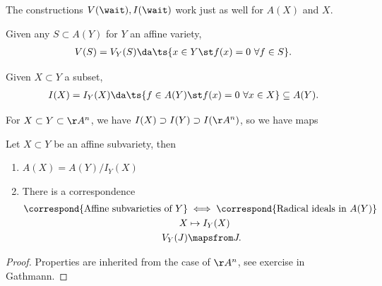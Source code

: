 \begin{observation}

The constructions \(V(\wait), I(\wait)\) work just as well for \(A(X)\)
and \(X\).

\end{observation}

Given any \(S\subset A(Y)\) for \(Y\) an affine variety,
\begin{align*}  
V(S) = V_Y(S) \da\ts{x\in Y \st f(x) = 0\,\,\forall f\in S}
.\end{align*}

Given \(X\subset Y\) a subset,
\begin{align*}  
I(X) = I_Y(X) \da\ts{f\in A(Y) \st f(x) = 0\,\,\forall x\in X} \subseteq A(Y)
.\end{align*}

\begin{example}

For \(X\subset Y \subset \AA^n\), we have
\(I(X) \supset I(Y) \supset I(\AA^n)\), so we have maps

\begin{center}
\end{center}

\end{example}

\begin{theorem}[?]

Let \(X\subset Y\) be an affine subvariety, then

\begin{enumerate}
\def\labelenumi{\alph{enumi}.}
\item
  \(A(X) = A(Y) / I_Y(X)\)
\item
  There is a correspondence
  \begin{align*}  
  \correspond{\text{Affine subvarieties of }Y} 
  &\iff \correspond{\text{Radical ideals in }A(Y)} \\
  X &\mapsto I_Y(X) \\
  V_Y(J) &\mapsfrom J
  .\end{align*}
\end{enumerate}

\end{theorem}

\begin{proof}

Properties are inherited from the case of \(\AA^n\), see exercise in
Gathmann.

\end{proof}

